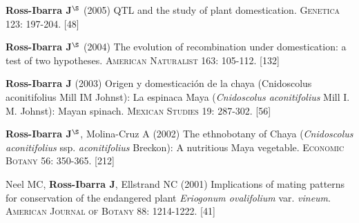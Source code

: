 \documentclass[letterpaper,10pt]{article}
\begin{document}
\begin{etaremune}
\item {\bf Ross-Ibarra J}$^\S$ (2005) QTL and the study of plant domestication.  \textsc{Genetica} 123: 197-204.
{} [48]\\


\item {\bf Ross-Ibarra J}$^\S$ (2004) The evolution of recombination under domestication: a test of two hypotheses.  \textsc{American Naturalist} 163: 105-112.
{} [132]\\


\item {\bf Ross-Ibarra J} (2003) Origen y domesticaci\'on de la chaya (Cnidoscolus aconitifolius Mill IM Johnst): La espinaca Maya (\emph{Cnidoscolus aconitifolius} Mill I. M. Johnst): Mayan spinach.  \textsc{Mexican Studies} 19: 287-302.
{} [56]\\

\item {\bf Ross-Ibarra J}$^\S$, Molina-Cruz A (2002) The ethnobotany of Chaya (\emph{Cnidoscolus aconitifolius} ssp. \emph{aconitifolius} Breckon): A nutritious Maya vegetable. \textsc{Economic Botany} 56: 350-365.
{} [212]\\

\item  Neel MC, {\bf Ross-Ibarra J}, Ellstrand NC (2001) Implications of mating patterns for conservation of the endangered plant \emph{Eriogonum ovalifolium} var. \emph{vineum}.  \textsc{American Journal of Botany} 88: 1214-1222.
{} [41]\\
\end{etaremune}


\end{document}

